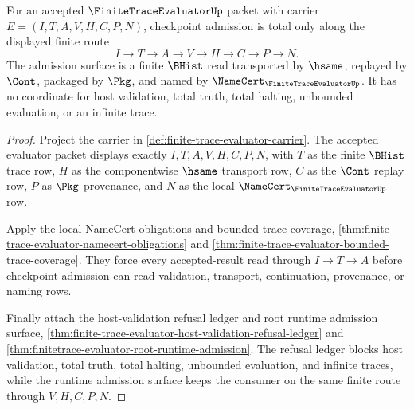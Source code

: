\begin{theorem}
\label{thm:finitetraceevaluator-root-checkpoint-admission-totality}
For an accepted $\FiniteTraceEvaluatorUp$ packet with carrier
$E=(I,T,A,V,H,C,P,N)$, checkpoint admission is total only along the displayed
finite route
$$
I \to T \to A \to V \to H \to C \to P \to N.
$$
The admission surface is a finite $\BHist$ read transported by $\hsame$,
replayed by $\Cont$, packaged by $\Pkg$, and named by
$\NameCert_{\FiniteTraceEvaluatorUp}$. It has no coordinate for host
validation, total truth, total halting, unbounded evaluation, or an infinite
trace.
\end{theorem}
\begin{proof}
Project the carrier in \autoref{def:finite-trace-evaluator-carrier}. The
accepted evaluator packet displays exactly $I,T,A,V,H,C,P,N$, with $T$ as the
finite $\BHist$ trace row, $H$ as the componentwise $\hsame$ transport row, $C$
as the $\Cont$ replay row, $P$ as $\Pkg$ provenance, and $N$ as the local
$\NameCert_{\FiniteTraceEvaluatorUp}$ row.

Apply the local NameCert obligations and bounded trace coverage,
\autoref{thm:finite-trace-evaluator-namecert-obligations} and
\autoref{thm:finite-trace-evaluator-bounded-trace-coverage}. They force every
accepted-result read through $I \to T \to A$ before checkpoint admission can
read validation, transport, continuation, provenance, or naming rows.

Finally attach the host-validation refusal ledger and root runtime admission
surface, \autoref{thm:finite-trace-evaluator-host-validation-refusal-ledger}
and \autoref{thm:finitetrace-evaluator-root-runtime-admission}. The refusal
ledger blocks host validation, total truth, total halting, unbounded
evaluation, and infinite traces, while the runtime admission surface keeps the
consumer on the same finite route through $V,H,C,P,N$.
\end{proof}

